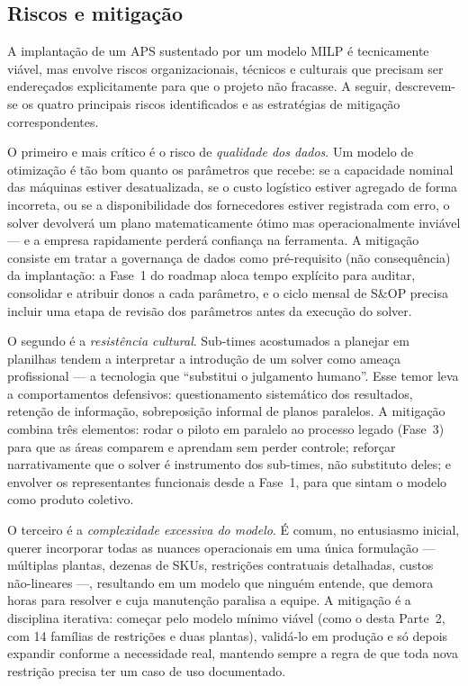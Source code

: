 \documentclass[11pt,a4paper]{article}
\begin{document}
\subsection{Riscos e mitigação}
A implantação de um APS sustentado por um modelo MILP é tecnicamente viável, mas envolve riscos organizacionais, técnicos e culturais que precisam ser endereçados explicitamente para que o projeto não fracasse. A seguir, descrevem-se os quatro principais riscos identificados e as estratégias de mitigação correspondentes.

O primeiro e mais crítico é o risco de \emph{qualidade dos dados}. Um modelo de otimização é tão bom quanto os parâmetros que recebe: se a capacidade nominal das máquinas estiver desatualizada, se o custo logístico estiver agregado de forma incorreta, ou se a disponibilidade dos fornecedores estiver registrada com erro, o solver devolverá um plano matematicamente ótimo mas operacionalmente inviável --- e a empresa rapidamente perderá confiança na ferramenta. A mitigação consiste em tratar a governança de dados como pré-requisito (não consequência) da implantação: a Fase~1 do roadmap aloca tempo explícito para auditar, consolidar e atribuir donos a cada parâmetro, e o ciclo mensal de S\&OP precisa incluir uma etapa de revisão dos parâmetros antes da execução do solver.

O segundo é a \emph{resistência cultural}. Sub-times acostumados a planejar em planilhas tendem a interpretar a introdução de um solver como ameaça profissional --- a tecnologia que ``substitui o julgamento humano''. Esse temor leva a comportamentos defensivos: questionamento sistemático dos resultados, retenção de informação, sobreposição informal de planos paralelos. A mitigação combina três elementos: rodar o piloto em paralelo ao processo legado (Fase~3) para que as áreas comparem e aprendam sem perder controle; reforçar narrativamente que o solver é instrumento dos sub-times, não substituto deles; e envolver os representantes funcionais desde a Fase~1, para que sintam o modelo como produto coletivo.

O terceiro é a \emph{complexidade excessiva do modelo}. É comum, no entusiasmo inicial, querer incorporar todas as nuances operacionais em uma única formulação --- múltiplas plantas, dezenas de SKUs, restrições contratuais detalhadas, custos não-lineares ---, resultando em um modelo que ninguém entende, que demora horas para resolver e cuja manutenção paralisa a equipe. A mitigação é a disciplina iterativa: começar pelo modelo mínimo viável (como o desta Parte~2, com 14 famílias de restrições e duas plantas), validá-lo em produção e só depois expandir conforme a necessidade real, mantendo sempre a regra de que toda nova restrição precisa ter um caso de uso documentado.
\end{document}
